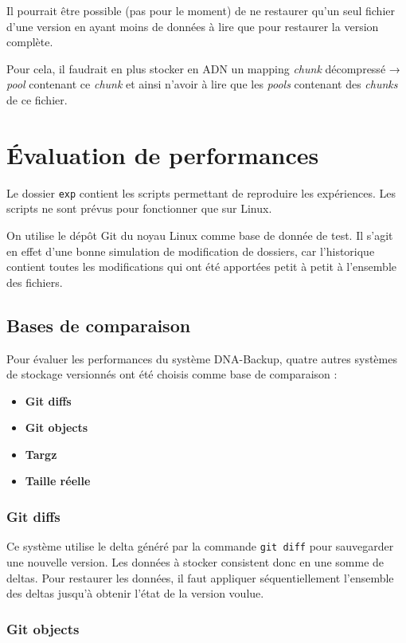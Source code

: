 \documentclass[a4paper,twocolumn]{article}
\begin{document}
Il pourrait être possible (pas pour le moment) de ne restaurer qu'un
seul fichier d'une version en ayant moins de données à lire que pour
restaurer la version complète.

Pour cela, il faudrait en plus stocker en ADN un mapping \emph{chunk}
décompressé → \emph{pool} contenant ce \emph{chunk} et ainsi n'avoir à
lire que les \emph{pools} contenant des \emph{chunks} de ce fichier.

\section{Évaluation de performances}

Le dossier \verb|exp| contient les scripts permettant de reproduire
les expériences. Les scripts ne sont prévus pour fonctionner que sur
Linux.

On utilise le dépôt Git du noyau Linux comme base de donnée de test. Il
s'agit en effet d'une bonne simulation de modification de dossiers, car
l'historique contient toutes les modifications qui ont été apportées
petit à petit à l'ensemble des fichiers.

\subsection{Bases de comparaison}

Pour évaluer les performances du système DNA-Backup, quatre autres
systèmes de stockage versionnés ont été choisis comme base de
comparaison :

\begin{itemize}
\item
  \textbf{Git diffs}
\item
  \textbf{Git objects}
\item
  \textbf{Targz}
\item
  \textbf{Taille réelle}
\end{itemize}

\subsubsection{Git diffs}

Ce système utilise le delta généré par la commande \verb|git diff|
pour sauvegarder une nouvelle version. Les données à stocker consistent
donc en une somme de deltas. Pour restaurer les données, il faut
appliquer séquentiellement l'ensemble des deltas jusqu'à obtenir l'état
de la version voulue.

\subsubsection{Git objects}
\end{document}
